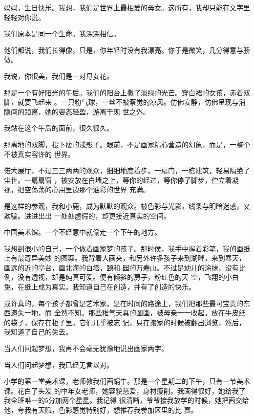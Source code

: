 \documentclass[12pt,a4paper]{article}
\begin{document}
		妈妈，生日快乐。我想，我们是世界上最相爱的母女。这所有，我却只能在文字里轻轻对你说。

		我们原本是同一个生命。我深深相信。


		他们都说，我们长得像，只是，你年轻时没有我漂亮。你于是微笑，几分得意与骄傲。

		我说，你很美，我们是一对母女花。

	\endwriting



		那是一个有好阳光的午后。我们的阳台上撒了淡绿的光芒。穿白裙的女孩，赤着双脚，就要飞起来
	。一只粉气球，一丝不被察觉的凉风。仿佛安静，仿佛呈现与消隐间的距离，她的姿态轻盈，游离于现
	世之外。

		我站在这个午后的面前，很久很久。

		那离地的双脚，投下瘦的浅影子。眼前，不是画家精心营造的幻象，而是，一整个不被真实容许的
	世界。

		偌大展厅，不过三三两两的观众，细细地度着步。一扇门，一栋建筑，轻易隔绝了尘世。一扇扇窗
	，被安放在白墙之上，等你的经过，等你停了脚步，伫立着凝视，把空荡荡的心用里边那个油彩的世界
	充满。

		是这样的参观，我和小鹿，成为默默的观众。被色彩与光影，线条与明暗迷惑，又欺骗。进进出出
	一处处虚假的，却更接近真实的空间。

		中国美术馆。一个不经意中就偷走一个下午的地方。

		我想到很小的自己，一个做着画家梦的孩子。那时侯，我手中握着彩笔，我的画纸上有最奇异美妙
	的图案。我背着大画夹，和另外许多孩子来到湖畔，来到春天，画远的近的亭台，画北海的白塔，颐和
	园的万寿山。不过是幼儿的涂抹，没有比例，没有透视，却是纯真可爱。便有倾斜的房子，粉红色的天
	空，飞翔的小白兔，在纸上成为真实。我知道自己在创造，并有了创造的快乐。

		或许真的，每个孩子都曾是艺术家。是在时间的路途上，我们把那些最可宝贵的东西遗失一地，而
	全然不知。那些稚气天真的图画，被母亲一一收起，放在牛皮纸的袋子，保存在柜子里。它们几乎被忘
	记，只在搬家的时候被翻出浏览，然后，我知道了自己的失去。

		当人们问起梦想，我再不会毫无犹豫地说出画家两字。

		当人们问起梦想，我已经无言以对。

		小学的第一堂美术课，老师教我们画蜗牛。那是一个星期二的下午，只有一节美术课。花白了头发
	的中年女老师，她容貌慈爱，身材瘦削。我画得很好，她给我了我全班唯一的5分加两个星星。我记得
	很清晰，爷爷接我放学的时候，她把画交给他，夸我有天赋，色彩感觉特别好，想推荐我参加区里的比
	赛。
\end{document}
